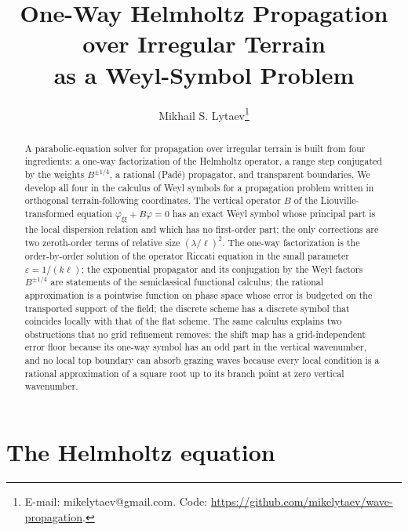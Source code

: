 \documentclass[11pt]{article}
\title{One-Way Helmholtz Propagation over Irregular Terrain\\ as a Weyl-Symbol Problem}
\author{Mikhail S. Lytaev\thanks{E-mail: mikelytaev@gmail.com. Code: \url{https://github.com/mikelytaev/wave-propagation}.}}
\date{}
\begin{document}
\maketitle

\begin{abstract}
A parabolic-equation solver for propagation over irregular terrain is built
from four ingredients: a one-way factorization of the Helmholtz operator, a
range step conjugated by the weights $B^{\pm1/4}$, a rational (Pad\'e)
propagator, and transparent boundaries. We develop all four in the calculus
of Weyl symbols for a propagation problem written in orthogonal
terrain-following coordinates. The
vertical operator $B$ of the Liouville-transformed equation
$\varphi_{\xi\xi}+B\varphi=0$ has an exact Weyl symbol whose principal part is
the local dispersion relation and which has no first-order part; the only
corrections are two zeroth-order terms of relative size $(\lambda/\ell)^2$.
The one-way factorization is the order-by-order solution of the operator
Riccati equation in the small parameter $\varepsilon=1/(k\ell)$; the
exponential propagator and its conjugation by the Weyl factors
$B^{\pm1/4}$ are statements of the
semiclassical functional calculus; the rational approximation is a pointwise function on phase
space whose error is budgeted on the transported support of the field; the
discrete scheme has a discrete symbol that coincides locally with that of the
flat scheme. The same calculus explains two obstructions that no grid
refinement removes: the shift map has a grid-independent error floor because
its one-way symbol has an odd part in the vertical wavenumber, and no local
top boundary can absorb grazing waves because every local condition is a
rational approximation of a square root up to its branch point at zero
vertical wavenumber.
\end{abstract}

\section{The Helmholtz equation}\label{sec:helm}
\end{document}
